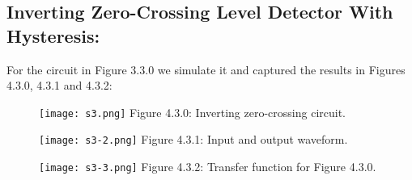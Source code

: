 \subsection{Inverting Zero-Crossing Level Detector With Hysteresis:}

For the circuit in Figure 3.3.0 we simulate it and captured the results in Figures 4.3.0, 4.3.1 and 4.3.2:

\begin{figure}[H]
\texttt{[image: s3.png]}
\centering \linebreak \linebreak Figure 4.3.0: Inverting zero-crossing circuit.
\end{figure} \hfill

\begin{multicols}{2}
\begin{figure}[H]
\texttt{[image: s3-2.png]}
\centering \linebreak \linebreak Figure 4.3.1: Input and output waveform.
\end{figure} \hfill

\begin{figure}[H]
\texttt{[image: s3-3.png]}
\centering \linebreak \linebreak Figure 4.3.2: Transfer function for Figure 4.3.0.
\end{figure} \hfill
\end{multicols} 

\pagebreak
